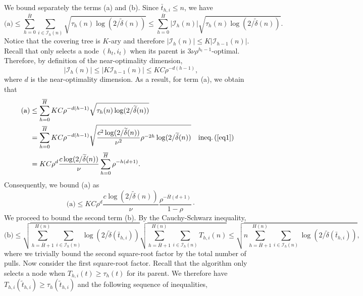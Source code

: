 We bound separately the terms (a) and (b). Since $\bar{t}_{h,i}\leq n$, we have
\begin{equation*} %
\text{(a)} \leq \sum_{h=0}^{\bar{H}}\sum_{i\in\mathcal{I}_h(n)} \sqrt{\tau_h(n)\operatorname{log}(2/\tilde{\delta}(n))} \leq \sum_{h=0}^{\bar{H}}|\mathcal{I}_h(n)| \sqrt{\tau_h(n)\operatorname{log}(2/\tilde{\delta}(n))}.
\end{equation*}
Notice that the covering tree is $K$-ary and therefore $|\mathcal{I}_h(n)| \leq K|\mathcal{I}_{h-1}(n)|$. Recall that \HCT only selects a node $(h_t,i_t)$ when its parent is $3\nu\rho^{h_t-1}$-optimal. Therefore, by definition of the near-optimality dimension,
\begin{equation*} %
|\mathcal{I}_h(n)| \leq| K\mathcal{I}_{h-1}(n)| \leq KC\rho^{-d(h-1)},
\end{equation*}
where $d$ is the near-optimality dimension. As a result, for term (a), we obtain that
\begin{align*}
    \text{(a)} & \leq \sum_{h=0}^{\bar{H}} KC\rho^{-d(h-1)} \sqrt{\tau_h(n)\log(2/\tilde{\delta}(n))} \\
               & = \sum_{h=0}^{\bar{H}} KC\rho^{-d(h-1)} \sqrt{\frac{c^2\log(2/\tilde{\delta}(n))}{\nu^2}\rho^{-2h}\log(2/\tilde{\delta}(n))} && \text{ineq.\,(\ref{eq1})} \\
               & = KC\rho^d \frac{c\operatorname{log}(2/\tilde{\delta}(n))}{\nu} \sum_{h=0}^{\bar{H}} \rho^{-h(d+1)}.
\end{align*}
Consequently, we  bound (a) as
\begin{equation} \label{eq17}
\text{(a)} \leq KC\rho^d \frac{c\operatorname{log}\left(2/\tilde{\delta}(n)\right)}{\nu} \frac{\rho^{-\bar{H}(d+1)}}{1-\rho}\cdot
\end{equation}
We proceed to bound the second term (b). By the Cauchy-Schwarz inequality,
\begin{equation*} %
\text{(b)} \leq \sqrt{\sum_{h=\bar{H}+1}^{H(n)}\sum_{i\in\mathcal{I}_h(n)} \operatorname{log}\left(2/\tilde{\delta}\left(\bar{t}_{h,i}\right)\right)} \sqrt{\sum_{h=\bar{H}+1}^{H(n)}\sum_{i\in\mathcal{I}_h(n)} T_{h,i}(n)} \leq \sqrt{n\sum_{h=\bar{H}+1}^{H(n)}\sum_{i\in\mathcal{I}_h(n)} \operatorname{log}\left(2/\tilde{\delta}\left(\bar{t}_{h,i}\right)\right)},
\end{equation*}
where we trivially bound the second square-root factor by the total number of pulls. Now consider the first square-root factor. Recall that the \HCT algorithm only selects a node when $T_{h,i}(t)\geq\tau_h(t)$ for its parent. We therefore have $T_{h,i}(\tilde{t}_{h,i})\geq\tau_h(\tilde{t}_{h,i})$ and the following sequence of inequalities,
